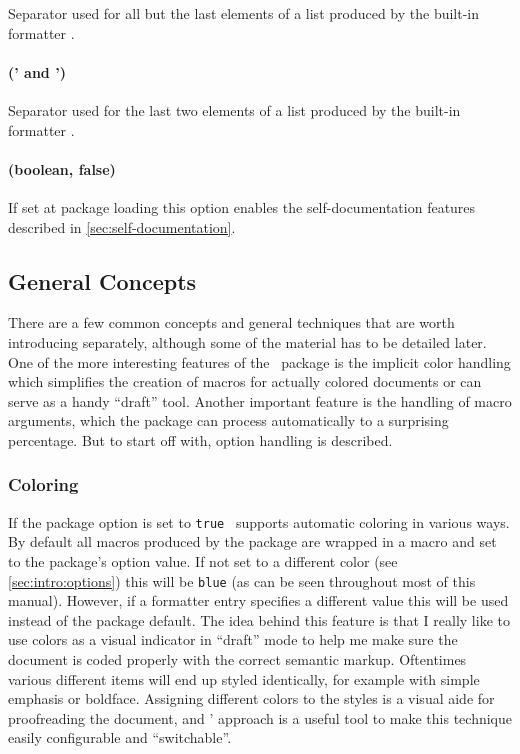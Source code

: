 \documentclass[12pt]{scrartcl}
\begin{document}
Separator used for all but the last elements of a list produced by the built-in
formatter .


\paragraph{ (' and ')}

Separator used for the last two elements of a list produced by the built-in formatter
.


\paragraph{ (boolean, false)}

If set at package loading this option enables the self-documentation features
described in \vref{sec:self-documentation}.


\subsection{General Concepts}
\label{sec:intro:general-concepts}

There are a few common concepts and general techniques that are worth introducing separately,
although some of the material has to be detailed later.  One of the more
interesting features of the \luaformatters\ package is the implicit color
handling which simplifies the creation of macros for actually colored documents
or can serve as a handy “draft” tool.  Another important feature is the handling
of macro arguments, which the package can process automatically to a surprising
percentage.  But to start off with, option handling is described.



\subsubsection{Coloring}
\label{sec:coloring}

If the package option  is set to \texttt{true}
\luaformatters\ supports automatic coloring in various ways.  By default
all macros produced by the package are wrapped in a  macro and
set to the package's  option value.  If not set to a
different color (see \vref{sec:intro:options}) this will be \texttt{blue}
(as can be seen throughout most of this manual).  However, if a formatter entry
specifies a different  value this will be used instead of the
package default.  The idea behind this feature is that I really like to use
colors as a visual indicator in “draft” mode to help me make sure the document
is coded properly with the correct semantic markup.  Oftentimes various
different items will end up styled identically, for example with simple emphasis
or boldface.  Assigning different colors to the styles is a visual aide for
proofreading the document, and \luaformatters' approach is a useful tool
to make this technique easily configurable and “switchable”.
\end{document}
